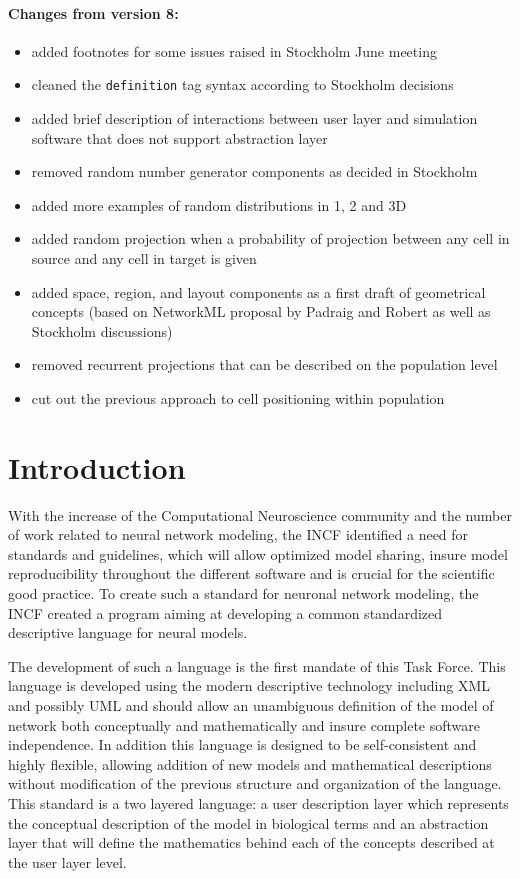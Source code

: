 \documentclass{article}
\begin{document}
\paragraph{Changes from version 8:}
\begin{itemize}
\item added footnotes for some issues raised in Stockholm June meeting
\item cleaned the {\tt definition} tag syntax according to Stockholm
decisions
\item added brief description of interactions between user layer and
simulation software that does not support abstraction layer
\item removed random number generator components as decided in Stockholm
\item added more examples of random distributions in 1, 2 and 3D
\item added random projection when a probability of projection between any
cell in source and any cell in target is given
\item added space, region, and layout components as a first draft of geometrical
concepts (based on NetworkML proposal by Padraig and Robert as well as
Stockholm discussions)
\item removed recurrent projections that can be described on the population
level
\item cut out the previous approach to cell positioning within population
\end{itemize}

\tableofcontents

\section{Introduction}

With the increase of the Computational Neuroscience community and the number of
work related to neural network modeling, the INCF identified a need for standards
and guidelines, which will allow optimized model sharing, insure model reproducibility
throughout the different software and is crucial for the scientific good practice.
To create such a standard for neuronal network modeling, the INCF created a program
aiming at developing a common standardized descriptive language for neural models.

The development of such a language is the first mandate of this Task Force. This
language is developed using the modern descriptive technology including XML and
possibly UML and should allow an unambiguous definition of the model of network both
conceptually and mathematically and insure complete software independence.
In addition this language is designed to be self-consistent and highly
flexible, allowing addition of new models and mathematical descriptions without
modification of the previous structure and organization of the language. This
standard is a two layered language: a user description layer which represents
the conceptual description of the model in biological terms and an abstraction layer
that will define the mathematics behind each of the concepts described at the user
layer level.
\end{document}
